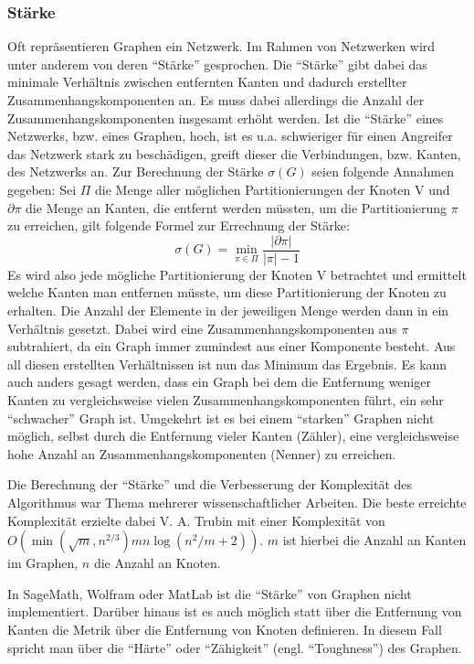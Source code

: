 \documentclass[a4paper,12pt,ngerman,chapterprefix=false,listof=totoc,bibliography=totoc]{scrreprt}
\begin{document}
\subsubsection*{Stärke}
{
Oft repräsentieren Graphen ein Netzwerk. Im Rahmen von Netzwerken wird unter anderem von deren "`Stärke"' gesprochen. Die "`Stärke"' gibt dabei das minimale Verhältnis zwischen entfernten Kanten und dadurch erstellter Zusammenhangskomponenten an. Es muss dabei allerdings die Anzahl der Zusammenhangskomponenten insgesamt erhöht werden. Ist die "`Stärke"' eines Netzwerks, bzw. eines Graphen, hoch, ist es u.a. schwieriger für einen Angreifer das Netzwerk stark zu beschädigen, greift dieser die Verbindungen, bzw. Kanten, des Netzwerks an. Zur Berechnung der Stärke \(\sigma(G)\) seien folgende Annahmen gegeben: Sei \(\Pi\) die Menge aller möglichen Partitionierungen der Knoten V und \(\partial\pi\) die Menge an Kanten, die entfernt werden müssten, um die Partitionierung \(\pi\) zu erreichen, gilt folgende Formel zur Errechnung der Stärke:
\[\sigma(G)=\min_{\pi\in\Pi}\frac{\vert\partial\pi\vert}{\vert\pi\vert -1}\]
Es wird also jede mögliche Partitionierung der Knoten V betrachtet und ermittelt welche Kanten man entfernen müsste, um diese Partitionierung der Knoten zu erhalten. Die Anzahl der Elemente in der jeweiligen Menge werden dann in ein Verhältnis gesetzt. Dabei wird eine Zusammenhangskomponenten aus \(\pi\) subtrahiert, da ein Graph immer zumindest aus einer Komponente besteht. Aus all diesen erstellten Verhältnissen ist nun das Minimum das Ergebnis. \cite{trubin_strenght_1993,cunningham_optimal_1985} Es kann auch anders gesagt werden, dass ein Graph bei dem die Entfernung weniger Kanten zu vergleichsweise vielen Zusammenhangskomponenten führt, ein sehr "`schwacher"' Graph ist. Umgekehrt ist es bei einem "`starken"' Graphen nicht möglich, selbst durch die Entfernung vieler Kanten (Zähler), eine vergleichsweise hohe Anzahl an Zusammenhangskomponenten (Nenner) zu erreichen.

Die Berechnung der "`Stärke"' und die Verbesserung der Komplexität des Algorithmus war Thema mehrerer wissenschaftlicher Arbeiten. Die beste erreichte Komplexität erzielte dabei V. A. Trubin mit einer Komplexität von \(O(\min(\sqrt{m},n^{2/3})mn\log(n^2/m+2))\). \(m\) ist hierbei die Anzahl an Kanten im Graphen, \(n\) die Anzahl an Knoten. \cite{trubin_strenght_1993}

In SageMath, Wolfram oder MatLab ist die "`Stärke"' von Graphen nicht implementiert. Darüber hinaus ist es auch möglich statt über die Entfernung von Kanten die Metrik über die Entfernung von Knoten definieren. In diesem Fall spricht man über die "`Härte"' oder "`Zähigkeit"' (engl. "`Toughness"') des Graphen. \cite{chvatal_tough_2006}
}
\end{document}

